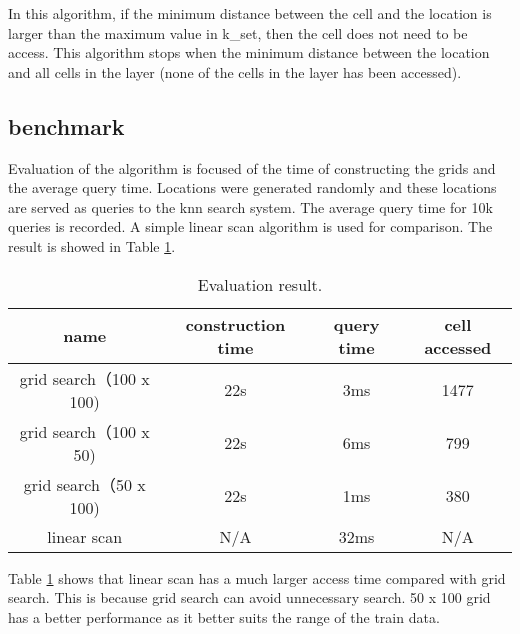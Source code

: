 \documentclass{article}
\def\v#1{{\fontfamily{cmtt}\selectfont #1}}
\begin{document}

In this algorithm, if the minimum distance between the cell and
the location is larger than the maximum value in \v{k\_set},
then the cell does not need to be access. This algorithm stops
when the minimum distance between the location and all cells in the layer
(none of the cells in the layer has been accessed).

\subsection{benchmark}
Evaluation of the algorithm is focused of the time of constructing the grids
and the average query time. Locations were generated randomly and
these locations are served as queries to the knn search system. The average
query time for 10k queries is recorded. A simple linear scan algorithm is
used for comparison. The result is showed in Table \ref{result}.

\begin{table}[tbh]
  \center
  \footnotesize
  \begin{tabular}{c|c|c|c}
    \textbf{name} & \textbf{construction time} & \textbf{query time} & \textbf{cell accessed}\\
    \hline
    grid search（100 x 100) & 22s & 3ms & 1477 \\
    \hline
    grid search（100 x 50) & 22s & 6ms & 799 \\
    \hline
    grid search（50 x 100) & 22s & 1ms & 380 \\
    \hline
    linear scan & N/A & 32ms & N/A
  \end{tabular}
  \caption{Evaluation result.}
  \label{result}
\end{table}

Table \ref{result} shows that linear scan has a much larger access time compared with
grid search. This is because grid search can avoid unnecessary search. 50 x 100 grid
has a better performance as it better suits the range of the train data.
\end{document}
